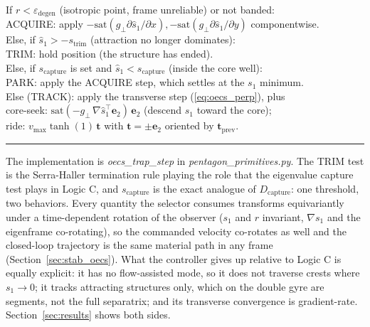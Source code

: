 \documentclass[lettersize,journal]{IEEEtran}
\begin{document}
\vspace{3pt}
\noindent If $r < \varepsilon_{\text{degen}}$ (isotropic point, frame
unreliable) or not banded:\\
\hspace*{1.5em} ACQUIRE: apply
$-\mathrm{sat}(g_\perp \partial\hat{s}_1/\partial x),
 -\mathrm{sat}(g_\perp \partial\hat{s}_1/\partial y)$
componentwise.\\
Else, if $\hat{s}_1 > -s_{\text{trim}}$ (attraction no longer
dominates):\\
\hspace*{1.5em} TRIM: hold position (the structure has ended).\\
Else, if $s_{\text{capture}}$ is set and $\hat{s}_1 <
s_{\text{capture}}$ (inside the core well):\\
\hspace*{1.5em} PARK: apply the ACQUIRE step, which settles at the
$s_1$ minimum.\\
Else (TRACK): apply the transverse step (\ref{eq:oecs_perp}), plus\\
\hspace*{1.5em} core-seek: $\mathrm{sat}(-g_\perp\,
\nabla\hat{s}_1^\top \mathbf{e}_2)\,\mathbf{e}_2$ (descend $s_1$ toward
the core);\\
\hspace*{1.5em} ride: $v_{\max}\tanh(1)\,\mathbf{t}$ with $\mathbf{t} =
\pm\mathbf{e}_2$ oriented by $\mathbf{t}_{\text{prev}}$.
\vspace{4pt}
\hrule
\vspace{4pt}

The implementation is \textit{oecs\_trap\_step} in
\textit{pentagon\_primitives.py}. The TRIM test is the Serra-Haller
termination rule playing the role that the eigenvalue capture test
plays in Logic C, and $s_{\text{capture}}$ is the exact analogue of
$D_{\text{capture}}$: one threshold, two behaviors. Every quantity the
selector consumes transforms equivariantly under a time-dependent
rotation of the observer ($s_1$ and $r$ invariant, $\nabla s_1$ and the
eigenframe co-rotating), so the commanded velocity co-rotates as well
and the closed-loop trajectory is the same material path in any frame
(Section~\ref{sec:stab_oecs}). What the controller gives up relative to
Logic C is equally explicit: it has no flow-assisted mode, so it does
not traverse crests where $s_1 \to 0$; it tracks attracting structures
only, which on the double gyre are segments, not the full separatrix;
and its transverse convergence is gradient-rate. Section~\ref{sec:results}
shows both sides.
\end{document}
